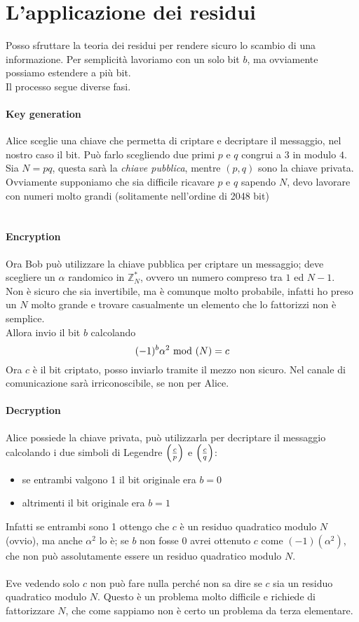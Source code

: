 	
	
	
	\section{L'applicazione dei residui}
	Posso sfruttare la teoria dei residui per rendere sicuro lo scambio di una informazione. Per semplicità lavoriamo con un solo bit $b$, ma ovviamente possiamo estendere a più bit. \\ Il processo segue diverse fasi.
	\paragraph{Key generation} Alice sceglie una chiave che permetta di criptare e decriptare il messaggio, nel nostro caso il bit. Può farlo scegliendo due primi $p$ e $q$ congrui a $3$ in modulo $4$. Sia $N=pq$, questa sarà la \textit{chiave pubblica}, mentre $(p,q)$ sono la chiave privata. \\ Ovviamente supponiamo che sia difficile ricavare $p$ e $q$ sapendo $N$, devo lavorare con numeri molto grandi (solitamente nell'ordine di 2048 bit) \\ \\
	\paragraph{Encryption} Ora Bob può utilizzare la chiave pubblica per criptare un messaggio; deve scegliere un $\alpha$ randomico in $\mathbb{Z}_N^*$, ovvero un numero compreso tra $1$ ed $N-1$. \\ Non è sicuro che sia invertibile, ma è comunque molto probabile, infatti ho preso un $N$ molto grande e trovare casualmente un elemento che lo fattorizzi non è semplice. \\ Allora invio il bit $b$ calcolando
	\begin{equation*}
	(-1)^b\alpha^2\ \mathrm{mod}\ (N)=c
	\end{equation*}
	Ora $c$ è il bit criptato, posso inviarlo tramite il mezzo non sicuro. Nel canale di comunicazione sarà irriconoscibile, se non per Alice.
	\paragraph{Decryption} Alice possiede la chiave privata, può utilizzarla per decriptare il messaggio calcolando i due simboli di Legendre $\left(\frac{c}{p}\right)$ e $\left(\frac{c}{q}\right)$:
	\begin{itemize}
		\item se entrambi valgono 1 il bit originale era $b=0$
		\item altrimenti il bit originale era $b=1$
	\end{itemize}
	Infatti se entrambi sono 1 ottengo che $c$ è un residuo quadratico modulo $N$ (ovvio), ma anche $\alpha^2$ lo è; se $b$ non fosse 0 avrei ottenuto $c$ come $(-1)(\alpha^2)$, che non può assolutamente essere un residuo quadratico modulo $N$. \\ \\
	Eve vedendo solo $c$ non può fare nulla perché non sa dire se $c$ sia un residuo quadratico modulo $N$. Questo è un problema molto difficile e richiede di fattorizzare $N$, che come sappiamo non è certo un problema da terza elementare.
